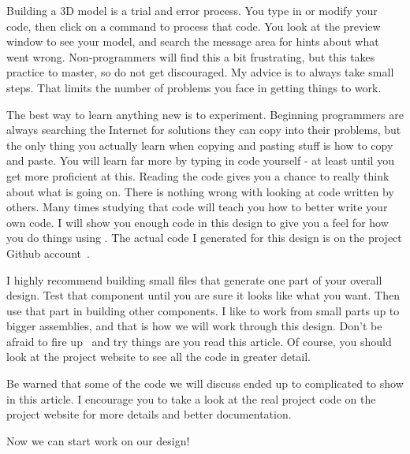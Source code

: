 Building a 3D model is a trial and error process. You type in or modify your
code, then click on a command to process that code. You look at the preview
window to see your model, and search the message area for hints about what went
wrong.  Non-programmers will find this a bit frustrating, but this takes
practice to master, so do not get discouraged. My advice is to always take
small steps.  That limits the number of problems you face in getting things to
work.

The best way to learn anything new is to experiment. Beginning programmers are
always searching the Internet for solutions they can copy into their problems,
but the only thing you actually learn when copying and pasting stuff is how to
copy and paste. You will learn far more by typing in code yourself - at least
until you get more proficient at this. Reading the code gives you a chance to
really think about what is going on. There is nothing wrong with looking at
code written by others. Many times studying that code will teach you how to
better write your own code. I will show you enough code in this design to give
you a feel for how you do things using \osc. The actual code I generated for
this design is on the project Github account~\cite{blackr}.

I highly recommend building small files that generate one part of your overall
design. Test that component until you are sure it looks like what you want.
Then use that part in building other components. I like to work from small
parts up to bigger assemblies, and that is how we will work through this
design. Don't be afraid to fire up \osc\ and try things are you read this
article. Of course, you should look at the project website to see all the code
in greater detail.

Be warned that some of the code we will discuss ended up to complicated to show
in this article. I encourage you to take a look at the real project code on the
project website for more details and better documentation.

Now we can start work on our design!

